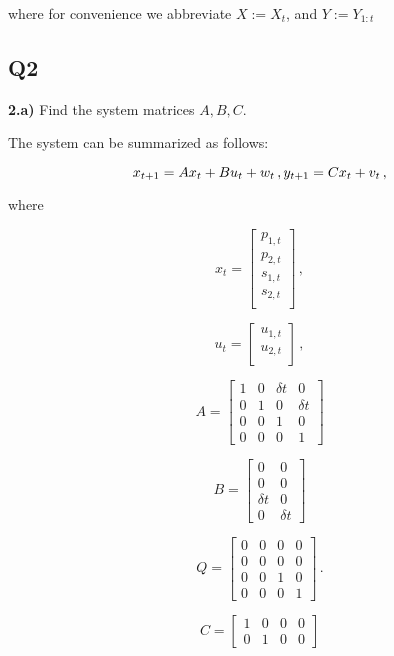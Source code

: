 \documentclass[11pt]{article}
\begin{document}
where for convenience we abbreviate \(X := X_{t}\), and \(Y := Y_{1:t}\)

    \subsection{Q2}\label{q2}

    \textbf{2.a)} Find the system matrices \(A,B,C\).

    The system can be summarized as follows:

\[
x_{t+1} = A x_{t} + B u_{t} + w_t\,, \\
y_{t+1} = C x_{t} + v_t\,,
\]

where

\[
x_t = 
\begin{bmatrix}
    p_{1,t} \\
    p_{2,t} \\
    s_{1,t} \\
    s_{2,t} \\
\end{bmatrix}\,,
\]

\[
u_t = 
\begin{bmatrix}
    u_{1,t} \\
    u_{2,t} \\
\end{bmatrix}\,,
\]

\[
A = 
\begin{bmatrix}
    1 & 0 & \delta t  & 0 \\
    0 & 1 & 0  & \delta t \\
    0 & 0 & 1 & 0 \\
    0 & 0 & 0  & 1
\end{bmatrix}
\]

\[
B = 
\begin{bmatrix}
    0 & 0 \\
    0 & 0 \\
    \delta t & 0 \\
    0 & \delta t
\end{bmatrix}
\]

\[
Q =
\begin{bmatrix}
    0 & 0 & 0  & 0 \\
    0 & 0 & 0  & 0 \\
    0 & 0 & 1 & 0 \\
    0 & 0 & 0  & 1
\end{bmatrix}\,.
\]

\[
C = 
\begin{bmatrix}
    1 & 0 & 0 & 0 \\
    0 & 1 & 0 & 0
\end{bmatrix}
\]
\end{document}
